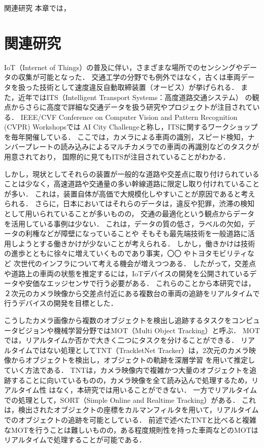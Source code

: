 \chapterhead
{関連研究}
{本章では，}

\section{関連研究}
IoT（Internet of Things）の普及に伴い，さまざまな場所でのセンシングやデータの収集が可能となった．
交通工学の分野でも例外ではなく，古くは車両データを扱った技術として速度違反自動取締装置（オービス）が挙げられる．
また，近年ではITS（Intelligent Transport Systems：高度道路交通システム）
の観点からさらに高度で詳細な交通データを扱う研究やプロジェクトが注目されている．
IEEE/CVF Conference on Computer Vision and Pattern Recognition (CVPR) Workshopsでは
AI City Challenge\cite{Naphade_2020_CVPR_Workshops}と称し，ITSに関するワークショップを毎年開催している．
ここでは，カメラによる車両の識別，スピード検知，ナンバープレートの読み込みによるマルチカメラでの車両の再識別などのタスクが用意されており，
国際的に見てもITSが注目されていることがわかる．

しかし，現状としてそれらの装置が一般的な道路や交差点に取り付けられていることは少なく，高速道路や交通量の多い幹線道路に限定し取り付けれていることが多い．
これは，装置自体が高価で大規模化しやすいことが原因であると考えられる．
さらに，日本においてはそれらのデータは，違反や犯罪，渋滞の検知として用いられていることが多いものの，
交通の最適化という観点からデータを活用している事例は少ない．
これは，データの質の低さ，ラベルの欠如，データの利権などが障壁になっていることや
そもそも最先端技術を一般道路に活用しようとする働きかけが少ないことが考えられる．
しかし，働きかけは技術の進歩とともに徐々に増えていくものであり事実，〇〇 %
やトヨタモビリティなど
次世代のインフラについて考える機会が増えつつある．
したがって，交差点や道路上の車両の状態を推定するには，IoTデバイスの開発を公開されているデータや安価なエッジセンサで行う必要がある．
これらのことから本研究では，２次元のカメラ映像から交差点付近にある複数台の車両の追跡をリアルタイムで行うデバイスの開発を目標とした．

こうしたカメラ画像から複数のオブジェクトを検出し追跡するタスクをコンピュータビジョンや機械学習分野ではMOT（Multi Object Tracking）と呼ぶ．
MOTでは，リアルタイムか否かで大きく二つにタスクを分けることができる．
リアルタイムではない処理としてTNT（TrackletNet Tracker）は，2次元のカメラ映像からオブジェクトを検出し，オブジェクトの軌跡を深層学習
を用いて推定していく方法である．\cite{wang2019exploit} \cite{tang2018single} TNTは，カメラ映像内で複雑かつ大量のオブジェクトを追跡することに向いているものの，カメラ映像を全て読み込んで処理するため，リアルタイム性
はなく，本研究では用いることができない．
一方でリアルタイムでの処理として，SORT（Simple Online and Realtime Tracking）がある．\cite{bewley2016simple} \cite{wojke2017simple}
これは，検出されたオブジェクトの座標をカルマンフィルタ\cite{kalman1960new}を用いて，リアルタイムでのオブジェクトの追跡を可能としている．
前述で述べたTNTと比べると複雑なMOTを行うことは難しいものの，ある程度規則性を持った車両などのMOTはリアルタイムで処理することが可能である．

\newpage
